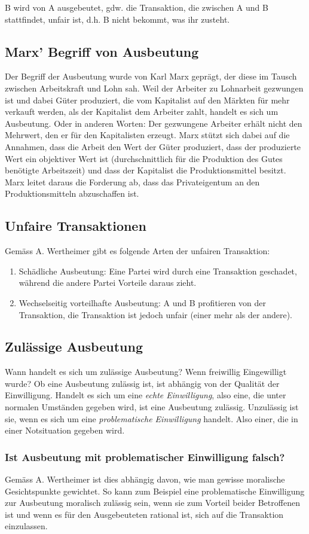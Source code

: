 \documentclass[../main.tex]{subfiles}
\begin{document}
\begin{warningbox}
B wird von A ausgebeutet, gdw. die Transaktion, die zwischen A und B stattfindet, unfair ist, d.h. B nicht bekommt, was ihr zusteht. 
\end{warningbox}

\subsection{Marx' Begriff von Ausbeutung}
Der Begriff der Ausbeutung wurde von Karl Marx geprägt, der diese im Tausch zwischen Arbeitskraft und Lohn sah. Weil der Arbeiter zu Lohnarbeit gezwungen ist und dabei Güter produziert, die vom Kapitalist auf den Märkten für mehr verkauft werden, als der Kapitalist dem Arbeiter zahlt, handelt es sich um Ausbeutung. Oder in anderen Worten: Der gezwungene Arbeiter erhält nicht den Mehrwert, den er für den Kapitalisten erzeugt. Marx stützt sich dabei auf die Annahmen, dass die Arbeit den Wert der Güter produziert, dass der produzierte Wert ein objektiver Wert ist (durchschnittlich für die Produktion des Gutes benötigte Arbeitszeit) und dass der Kapitalist die Produktionsmittel besitzt. Marx leitet daraus die Forderung ab, dass das Privateigentum an den Produktionsmitteln abzuschaffen ist.   

\subsection{Unfaire Transaktionen}
Gemäss A. Wertheimer gibt es folgende Arten der unfairen Transaktion:
\begin{enumerate}
	\item Schädliche Ausbeutung: Eine Partei wird durch eine Transaktion geschadet, während die andere Partei Vorteile daraus zieht. 
	\item Wechselseitig vorteilhafte Ausbeutung: A und B profitieren von der Transaktion, die Transaktion ist jedoch unfair (einer mehr als der andere). 
\end{enumerate}

\subsection{Zulässige Ausbeutung}
Wann handelt es sich um zulässige Ausbeutung? Wenn freiwillig Eingewilligt wurde? Ob eine Ausbeutung zulässig ist, ist abhängig von der Qualität der Einwilligung. Handelt es sich um eine \textit{echte Einwilligung}, also eine, die unter normalen Umständen gegeben wird, ist eine Ausbeutung zulässig. Unzulässig ist sie, wenn es sich um eine \textit{problematische Einwilligung} handelt. Also einer, die in einer Notsituation gegeben wird. 
\subsubsection{Ist Ausbeutung mit problematischer Einwilligung falsch?}
Gemäss A. Wertheimer ist dies abhängig davon, wie man gewisse moralische Gesichtspunkte gewichtet. So kann zum Beispiel eine problematische Einwilligung zur Ausbeutung moralisch zulässig sein, wenn sie zum Vorteil beider Betroffenen ist und wenn es für den Ausgebeuteten rational ist, sich auf die Transaktion einzulassen.
\end{document}
